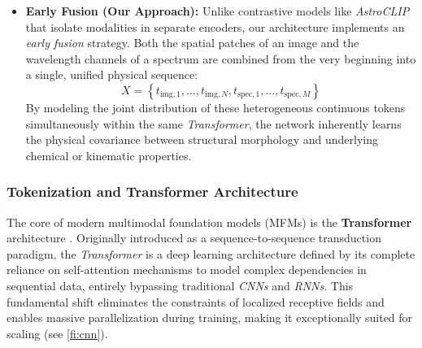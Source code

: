 \begin{itemize}
    \item \textbf{Early Fusion (Our Approach):} Unlike contrastive models like \textit{AstroCLIP} that isolate modalities in separate encoders, our architecture implements an \textit{early fusion} strategy. Both the spatial patches of an image and the wavelength channels of a spectrum are combined from the very beginning into a single, unified physical sequence:
    \begin{equation}
        X = \left\{t_{\text{img}, 1}, \dots, t_{\text{img}, N}, t_{\text{spec}, 1}, \dots, t_{\text{spec}, M}\right\}
        \label{eq:early_fusion}
    \end{equation}
    By modeling the joint distribution of these heterogeneous continuous tokens simultaneously within the same \textit{Transformer}, the network inherently learns the physical covariance between structural morphology and underlying chemical or kinematic properties.
\end{itemize}


\subsubsection{Tokenization and Transformer Architecture} \label{sec:tb:arq}

The core of modern multimodal foundation models (\glspl{MFM}) is the \textbf{Transformer} architecture \autocite{ar:attention}. Originally introduced as a sequence-to-sequence transduction paradigm, the \textit{Transformer} is a deep learning architecture defined by its complete reliance on self-attention mechanisms to model complex dependencies in sequential data, entirely bypassing traditional \textit{\glspl{CNN}} and \textit{\glspl{RNN}}. This fundamental shift eliminates the constraints of localized receptive fields and enables massive parallelization during training, making it exceptionally suited for scaling (see \cref{fi:cnn}).


